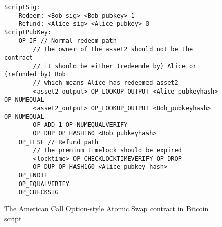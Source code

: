 \begin{figure}
\begin{lstlisting}[language=Solidity, basicstyle=\tiny]
ScriptSig:
    Redeem: <Bob_sig> <Bob_pubkey> 1
    Refund: <Alice_sig> <Alice_pubkey> 0
ScriptPubKey:
    OP_IF // Normal redeem path
        // the owner of the asset2 should not be the contract
        // it should be either (redeemde by) Alice or (refunded by) Bob
        // which means Alice has redeemed asset2
        <asset2_output> OP_LOOKUP_OUTPUT <Alice_pubkeyhash> OP_NUMEQUAL
        <asset2_output> OP_LOOKUP_OUTPUT <Bob_pubkeyhash> OP_NUMEQUAL
        OP_ADD 1 OP_NUMEQUALVERIFY
        OP_DUP OP_HASH160 <Bob_pubkeyhash>
    OP_ELSE // Refund path
        // the premium timelock should be expired
        <locktime> OP_CHECKLOCKTIMEVERIFY OP_DROP
        OP_DUP OP_HASH160 <Alice pubkey hash>
    OP_ENDIF
    OP_EQUALVERIFY
    OP_CHECKSIG
\end{lstlisting}
\label{code:bitcoin_contract_option}
\caption{The American Call Option-style Atomic Swap contract in Bitcoin script}
\end{figure}

